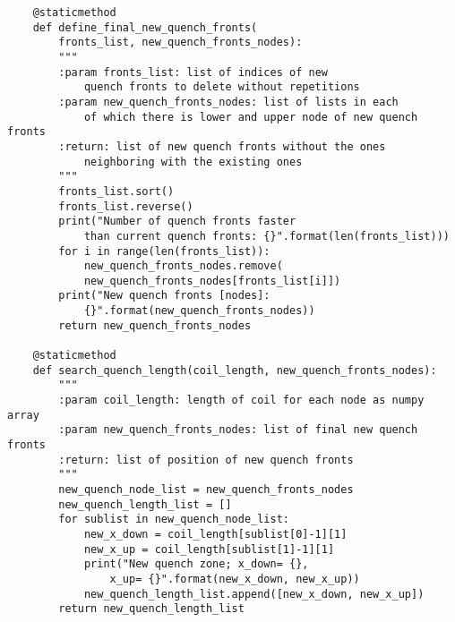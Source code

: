 \begin{verbatim}
    @staticmethod
    def define_final_new_quench_fronts(
        fronts_list, new_quench_fronts_nodes):
        """
        :param fronts_list: list of indices of new 
            quench fronts to delete without repetitions
        :param new_quench_fronts_nodes: list of lists in each 
            of which there is lower and upper node of new quench fronts
        :return: list of new quench fronts without the ones 
            neighboring with the existing ones
        """
        fronts_list.sort()
        fronts_list.reverse()
        print("Number of quench fronts faster 
            than current quench fronts: {}".format(len(fronts_list)))
        for i in range(len(fronts_list)):
            new_quench_fronts_nodes.remove(
            new_quench_fronts_nodes[fronts_list[i]])
        print("New quench fronts [nodes]: 
            {}".format(new_quench_fronts_nodes))
        return new_quench_fronts_nodes

    @staticmethod
    def search_quench_length(coil_length, new_quench_fronts_nodes):
        """
        :param coil_length: length of coil for each node as numpy array
        :param new_quench_fronts_nodes: list of final new quench fronts
        :return: list of position of new quench fronts
        """
        new_quench_node_list = new_quench_fronts_nodes
        new_quench_length_list = []
        for sublist in new_quench_node_list:
            new_x_down = coil_length[sublist[0]-1][1]
            new_x_up = coil_length[sublist[1]-1][1]
            print("New quench zone; x_down= {}, 
                x_up= {}".format(new_x_down, new_x_up))
            new_quench_length_list.append([new_x_down, new_x_up])
        return new_quench_length_list
\end{verbatim}